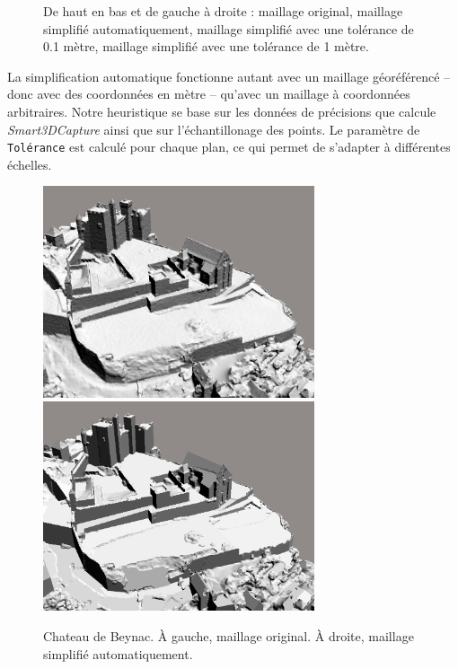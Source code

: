 ﻿\documentclass[12pt, twoside]{article}
\begin{document}
\begin{figure}[h]
\caption{\label{fig:niv2} De haut en bas et de gauche à droite : maillage original, maillage simplifié automatiquement, maillage simplifié avec une tolérance de 0.1 mètre, maillage simplifié avec une tolérance de 1 mètre.}
\end{figure}

La simplification automatique fonctionne autant avec un maillage géoréférencé -- donc avec des coordonnées en mètre -- qu'avec un maillage à coordonnées arbitraires. Notre heuristique se base sur les données de précisions que calcule \textit{Smart3DCapture} ainsi que sur l'échantillonage des points. Le paramètre de \texttt{Tolérance} est calculé pour chaque plan, ce qui permet de s'adapter à différentes échelles.

\begin{figure}[h]
\centering
\includegraphics[width=8cm,keepaspectratio]{Beynac.png} \includegraphics[width=8cm,keepaspectratio]{BeynacAuto.png}
\caption{Chateau de Beynac. À gauche, maillage original. À droite, maillage simplifié automatiquement.}
\end{figure}
\end{document}
